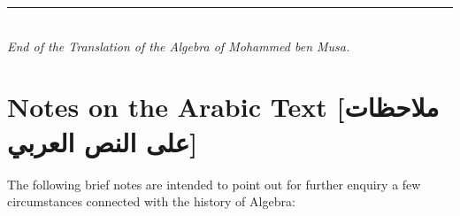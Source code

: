 \clearpage

\vspace{1cm}
\begin{center}
\rule{0.5\textwidth}{1pt}\\[0.5cm]
{\small\textit{End of the Translation of the Algebra of Mohammed ben Musa.}}
\end{center}

\vfill
\clearpage

\section*{Notes on the Arabic Text \textnormal{[\arabicfont\beginR ملاحظات على النص العربي\endR]}}

The following brief notes are intended to point out for further enquiry a few circumstances connected with the history of Algebra:


